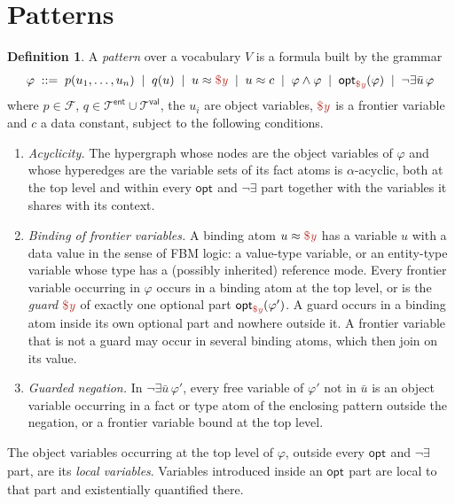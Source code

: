 \documentclass[11pt]{amsart}
\theoremstyle{definition}
\newtheorem{definition}{Definition}
\theoremstyle{remark}
\newcommand{\FBM}{FBM logic}
\newcommand{\Types}{\mathcal{T}}
\newcommand{\EntTypes}{\Types^{\mathsf{ent}}}
\newcommand{\ValTypes}{\Types^{\mathsf{val}}}
\newcommand{\FactTypes}{\mathcal{F}}
\newcommand{\dataEq}{\mathrel{\approx}}
\newcommand{\fv}[1]{\textcolor{BrickRed}{\$\mathit{#1}}}
\newcommand{\Opt}[1]{\mathsf{opt}_{#1}}
\begin{document}
\section{Patterns}
\label{sec:patterns}

\begin{definition}
\label{def:pattern}
A \emph{pattern} over a vocabulary $V$ is a formula built by the grammar
$$\varphi \;::=\; p(u_1, \ldots, u_n) \;\mid\; q(u) \;\mid\; u \dataEq \fv{y}
  \;\mid\; u \dataEq c \;\mid\; \varphi \wedge \varphi \;\mid\;
  \Opt{\fv{y}}(\varphi) \;\mid\; \neg \exists \bar u\, \varphi$$
where $p \in \FactTypes$, $q \in \EntTypes \cup \ValTypes$, the $u_i$ are
object variables, $\fv{y}$ is a frontier variable and $c$ a data constant,
subject to the following conditions.
\begin{enumerate}
  \item[(P1)] \emph{Acyclicity.} The hypergraph whose nodes are the object
    variables of $\varphi$ and whose hyperedges are the variable sets of its
    fact atoms is $\alpha$-acyclic, both at the top level and within every
    $\Opt{}$ and $\neg\exists$ part together with the variables it shares
    with its context.
  \item[(P2)] \emph{Binding of frontier variables.} A binding atom
    $u \dataEq \fv{y}$ has a variable $u$ with a data value in the sense of
    \FBM: a value-type variable, or an entity-type variable whose type has
    a (possibly inherited) reference mode. Every frontier
    variable occurring in $\varphi$ occurs in a binding atom at the top
    level, or is the \emph{guard} $\fv{y}$ of exactly one optional part
    $\Opt{\fv{y}}(\varphi')$. A guard occurs in a binding atom inside its
    own optional part and nowhere outside it. A frontier variable that is
    not a guard may occur in several binding atoms, which then join on its
    value.
  \item[(P3)] \emph{Guarded negation.} In $\neg\exists \bar u\, \varphi'$,
    every free variable of $\varphi'$ not in $\bar u$ is an object variable
    occurring in a fact or type atom of the enclosing pattern outside the
    negation, or a frontier variable bound at the top level.
\end{enumerate}
The object variables occurring at the top level of $\varphi$, outside every
$\Opt{}$ and $\neg\exists$ part, are its \emph{local variables}. Variables
introduced inside an $\Opt{}$ part are local to that part and existentially
quantified there.
\end{definition}
\end{document}
